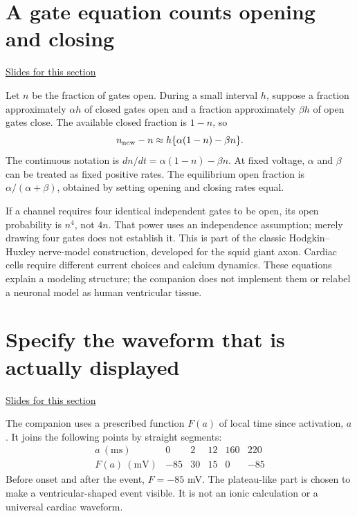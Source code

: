 \documentclass[11pt,letterpaper]{article}
\theoremstyle{definition}\newtheorem{definition}{Definition}\newtheorem{example}{Example}
\numberwithin{equation}{section}
\begin{document}
\section{A gate equation counts opening and closing}
\hypertarget{note-a-gate-equation-counts-opening-and-closing}{}\label{note:a-gate-equation-counts-opening-and-closing}
{\small \href{slides.html\#frame=count-gates-available-to-change\&step=1}{Slides for this section}}\par
Let $n$ be the fraction of gates open. During a small interval $h$, suppose a fraction approximately $\alpha h$ of closed gates open and a fraction approximately $\beta h$ of open gates close. The available closed fraction is $1-n$, so
\[
n_{\rm new}-n\approx h\{\alpha(1-n)-\beta n\}.
\]
The continuous notation is $dn/dt=\alpha(1-n)-\beta n$. At fixed voltage, $\alpha$ and $\beta$ can be treated as fixed positive rates. The equilibrium open fraction is $\alpha/(\alpha+\beta)$, obtained by setting opening and closing rates equal.

If a channel requires four identical independent gates to be open, its open probability is $n^4$, not $4n$. That power uses an independence assumption; merely drawing four gates does not establish it. This is part of the classic Hodgkin--Huxley nerve-model construction, developed for the squid giant axon. Cardiac cells require different current choices and calcium dynamics. These equations explain a modeling structure; the companion does not implement them or relabel a neuronal model as human ventricular tissue.
\section{Specify the waveform that is actually displayed}
\hypertarget{note-specify-the-waveform-that-is-actually-displayed}{}\label{note:specify-the-waveform-that-is-actually-displayed}
{\small \href{slides.html\#frame=the-supplied-waveform\&step=1}{Slides for this section}}\par
The companion uses a prescribed function $F(a)$ of local time since activation, $a$. It joins the following points by straight segments:
\[
\begin{array}{c|rrrrr}
a\ (\mathrm{ms})&0&2&12&160&220\\\hline
F(a)\ (\mathrm{mV})&-85&30&15&0&-85
\end{array}
\]
Before onset and after the event, $F=-85$ mV. The plateau-like part is chosen to make a ventricular-shaped event visible. It is not an ionic calculation or a universal cardiac waveform.
\end{document}
